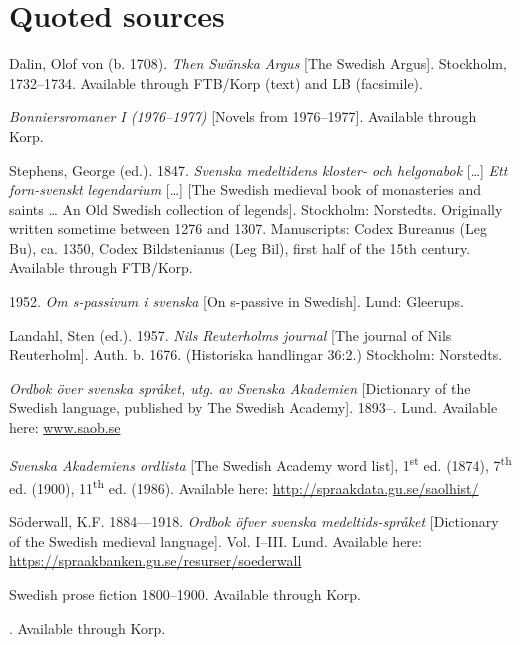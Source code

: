 \documentclass[output=paper]{langscibook}
\begin{document}
\section*{Quoted sources}
\begin{description}\sloppy
\item[\textit{Argus}:] Dalin, Olof von (b. 1708). \textit{Then Swänska Argus} [The Swedish Argus]. Stockholm, 1732–1734. Available through FTB/Korp (text) and LB (facsimile).
\item[Bonniers:] \textit{Bonniersromaner I (1976–1977)} [Novels from 1976–1977]. Available through Korp.
\item[Leg:] Stephens, George (ed.). 1847. \textit{Svenska medeltidens kloster- och helgonabok} […] \textit{Ett forn-svenskt legendarium} […] [The Swedish medieval book of monasteries and saints … An Old Swedish collection of legends]. Stockholm: Norstedts. Originally written sometime between 1276 and 1307. Manuscripts: Codex Bureanus (Leg Bu), ca. 1350, Codex Bildstenianus (Leg Bil), first half of the 15th century. Available through FTB/Korp.
\item[\normalfont Holm, Gösta.] 1952. \textit{Om s-passivum i svenska} [On s-passive in Swedish]. Lund: Gleerups.
\item[Reuterholm:] Landahl, Sten (ed.). 1957. \textit{Nils Reuterholms journal} [The journal of Nils Reuterholm]. Auth. b. 1676. (Historiska handlingar 36:2.) Stockholm: Norstedts.
\item[SAOB:] \textit{Ordbok över svenska språket, utg. av Svenska Akademien} [Dictionary of the Swedish language, published by The Swedish Academy]. 1893–. Lund. Available here: \href{http://www.saob.se}{{www.saob.se}} 
\item[SAOL:] \textit{Svenska Akademiens ordlista} [The Swedish Academy word list], 1\textsuperscript{st} ed. (1874), 7\textsuperscript{th} ed. (1900), 11\textsuperscript{th} ed. (1986). Available here: \url{http://spraakdata.gu.se/saolhist/}
\item[Sdw:] Söderwall, K.F. 1884—1918. \textit{Ordbok öfver svenska medeltids-språket} [Dictionary of the Swedish medieval language]. Vol. I–III. Lund. Available here: \url{https://spraakbanken.gu.se/resurser/soederwall} 
\item[SPF:] Swedish prose fiction 1800–1900. Available through Korp. 
\item[\textit{Äldre svenska romaner}] [Older Swedish novels]. Available through Korp. 
\end{description}
\end{document}

